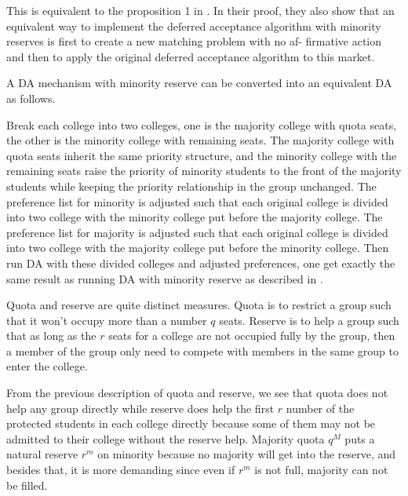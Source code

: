 This is equivalent to the proposition 1 in \parencite{Hafalir2013}. 
In their proof, they also show that an equivalent way to implement the deferred acceptance
algorithm with minority reserves is first to create a new matching problem with no af-
firmative action and then to apply the original deferred acceptance algorithm to this
market.

A DA mechanism with minority reserve can be converted into an equivalent DA as follows.

  Break each college into two colleges, one is the majority college with quota seats, the other is the minority college with remaining seats. The majority college with quota seats inherit the same priority structure, and the minority college with the remaining seats raise the priority of minority students  to the front of the majority students while keeping the priority relationship in the group unchanged. The preference list for minority is adjusted such that each original college is divided into two college with the minority college put before the majority college.  The preference list for majority is adjusted such that each original college is divided into two college with the majority college put before the minority college. Then run DA with these divided colleges and adjusted preferences, one get exactly the same result as running DA with minority reserve as described in \parencite{Hafalir2013}.




Quota and reserve are quite distinct measures. Quota is to restrict a group such that it won't occupy more than  a number $q$ seats. Reserve is  to help a group such that as long as the $r$ seats for a college are not occupied fully by the group, then a member of the group only need to compete with members in the same group to enter the college.

From the previous description of quota and reserve, we see that quota does not help any group directly while reserve does help the first $r$ number of the protected students in each college directly because some of them may not be admitted to their college without the reserve help. Majority quota $q^M$ puts a natural reserve $r^m$ on minority because no majority will get into the reserve, and besides that, it is more demanding since even if $r^m$ is not full, majority can not be filled.


